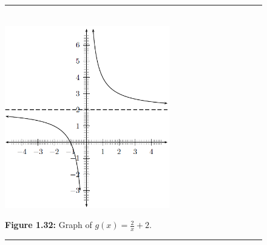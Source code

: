 	\begin{figure}[H] %
    \begin{center}
    \rule[.1in]{\figurerulewidth}{.005in} \\
        \label{m39341*uid162!!!underscore!!!media}\label{m39341*uid162!!!underscore!!!printimage}\includegraphics[height=300px]{col11306.imgs/m39341_MG10C11_026.png} %
      \vspace{2pt}
    \vspace{\rubberspace}\par \begin{cnxcaption}
	  \small \textbf{Figure 1.32: }Graph of $g\left(x\right)=\frac{2}{x}+2$.
	\end{cnxcaption}
    \vspace{.1in}
    \rule[.1in]{\figurerulewidth}{.005in} \\
    \end{center}
 \end{figure}       
\par
            \label{m39341*eid75993}\vspace{.5cm} 
      \noindent
